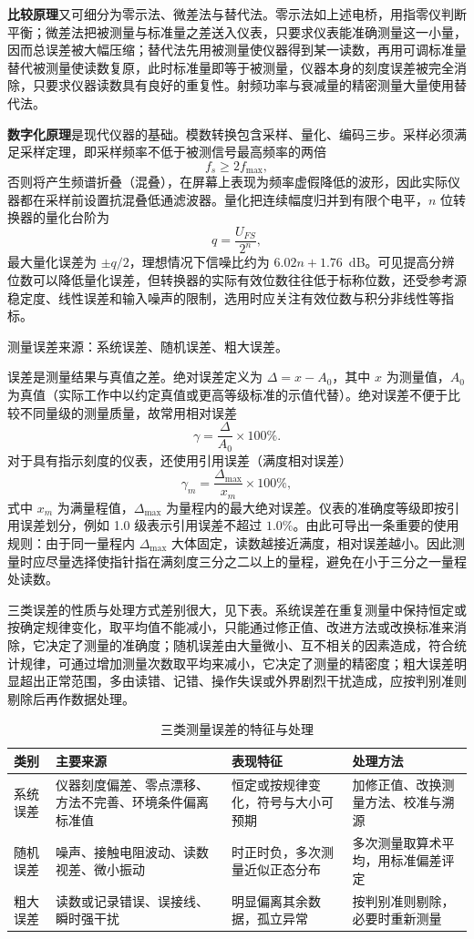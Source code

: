 \textbf{比较原理}又可细分为零示法、微差法与替代法。零示法如上述电桥，用指零仪判断平衡；微差法把被测量与标准量之差送入仪表，只要求仪表能准确测量这一小量，因而总误差被大幅压缩；替代法先用被测量使仪器得到某一读数，再用可调标准量替代被测量使读数复原，此时标准量即等于被测量，仪器本身的刻度误差被完全消除，只要求仪器读数具有良好的重复性。射频功率与衰减量的精密测量大量使用替代法。

\textbf{数字化原理}是现代仪器的基础。模数转换包含采样、量化、编码三步。采样必须满足采样定理，即采样频率不低于被测信号最高频率的两倍
\[
f_s \ge 2 f_{\max},
\]
否则将产生频谱折叠（混叠），在屏幕上表现为频率虚假降低的波形，因此实际仪器都在采样前设置抗混叠低通滤波器。量化把连续幅度归并到有限个电平，$n$ 位转换器的量化台阶为
\[
q = \frac{U_{FS}}{2^{n}},
\]
最大量化误差为 $\pm q/2$，理想情况下信噪比约为 $6.02n + 1.76$~dB。可见提高分辨位数可以降低量化误差，但转换器的实际有效位数往往低于标称位数，还受参考源稳定度、线性误差和输入噪声的限制，选用时应关注有效位数与积分非线性等指标。

测量误差来源：系统误差、随机误差、粗大误差。

误差是测量结果与真值之差。绝对误差定义为 $\Delta = x - A_0$，其中 $x$ 为测量值，$A_0$ 为真值（实际工作中以约定真值或更高等级标准的示值代替）。绝对误差不便于比较不同量级的测量质量，故常用相对误差
\[
\gamma = \frac{\Delta}{A_0} \times 100\%.
\]
对于具有指示刻度的仪表，还使用引用误差（满度相对误差）
\[
\gamma_m = \frac{\Delta_{\max}}{x_m} \times 100\%,
\]
式中 $x_m$ 为满量程值，$\Delta_{\max}$ 为量程内的最大绝对误差。仪表的准确度等级即按引用误差划分，例如 1.0 级表示引用误差不超过 $1.0\%$。由此可导出一条重要的使用规则：由于同一量程内 $\Delta_{\max}$ 大体固定，读数越接近满度，相对误差越小。因此测量时应尽量选择使指针指在满刻度三分之二以上的量程，避免在小于三分之一量程处读数。

三类误差的性质与处理方式差别很大，见下表。系统误差在重复测量中保持恒定或按确定规律变化，取平均值不能减小，只能通过修正值、改进方法或改换标准来消除，它决定了测量的准确度；随机误差由大量微小、互不相关的因素造成，符合统计规律，可通过增加测量次数取平均来减小，它决定了测量的精密度；粗大误差明显超出正常范围，多由读错、记错、操作失误或外界剧烈干扰造成，应按判别准则剔除后再作数据处理。

\begin{table}[htbp]
\centering
\caption{三类测量误差的特征与处理}
\begin{tabular}{|p{2.0cm}|p{4.4cm}|p{3.0cm}|p{3.4cm}|}
\hline
\textbf{类别} & \textbf{主要来源} & \textbf{表现特征} & \textbf{处理方法} \\
\hline
系统误差 & 仪器刻度偏差、零点漂移、方法不完善、环境条件偏离标准值 & 恒定或按规律变化，符号与大小可预期 & 加修正值、改换测量方法、校准与溯源 \\
\hline
随机误差 & 噪声、接触电阻波动、读数视差、微小振动 & 时正时负，多次测量近似正态分布 & 多次测量取算术平均，用标准偏差评定 \\
\hline
粗大误差 & 读数或记录错误、误接线、瞬时强干扰 & 明显偏离其余数据，孤立异常 & 按判别准则剔除，必要时重新测量 \\
\hline
\end{tabular}
\end{table}

